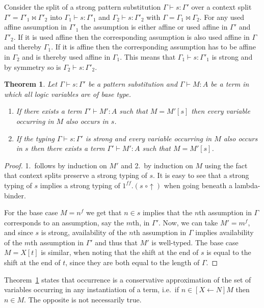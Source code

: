 \documentclass{eptcs}
\newtheorem{thm}{Theorem}[section]
\theoremstyle{definition}
\begin{document}
Consider the split of a strong pattern substitution
$\Gamma\vdash s:\Gamma'$ over a context split
$\Gamma'=\Gamma'_1\Join\Gamma'_2$ into $\Gamma_1\vdash s:\Gamma'_1$ and
$\Gamma_2\vdash s:\Gamma'_2$ with $\Gamma=\Gamma_1\Join\Gamma_2$.
For any used affine assumption in $\Gamma'_1$ the assumption is either
affine or used affine in $\Gamma'$ and $\Gamma'_2$.  If it is used affine then the
corresponding assumption is also used affine in $\Gamma$ and thereby
$\Gamma_1$.  If it is affine then the corresponding assumption has to be
affine in $\Gamma_2$ and is thereby used affine in $\Gamma_1$.  This
means that $\Gamma_1\vdash s:\Gamma'_1$ is strong and by symmetry so is
$\Gamma_2\vdash s:\Gamma'_2$.

\begin{thm}\label{thm:occurrence}
Let $\Gamma\vdash s:\Gamma'$ be a pattern substitution and
$\Gamma\vdash M:A$ be a term in which all logic variables
are of base type.
\begin{enumerate}
\item
If there exists a term $\Gamma'\vdash M':A$ such that $M=M'[s]$
then every variable occurring in $M$ also occurs in $s$.
\item
If the typing $\Gamma\vdash s:\Gamma'$ is strong and every variable
occurring in $M$ also occurs in $s$ then there exists a term
$\Gamma'\vdash M':A$ such that $M=M'[s]$.
\end{enumerate}
\end{thm}
\begin{proof}
1.\ follows by induction on $M'$ and 2.\ by induction on $M$  using the
fact that context splits preserve a strong typing of $s$.  It is easy to see
that a strong typing of $s$ implies a strong typing of
$1^{ff}.(s\;\circ\uparrow)$ when going beneath a lambda-binder.

For the base case
$M=n^f$ we get that $n\in s$ implies that the $n$th assumption in
$\Gamma$ corresponds to an assumption, say the $m$th, in $\Gamma'$.
Now, we can take $M'=m^f$, and since $s$ is strong, availability of the
$n$th assumption in $\Gamma$ implies availability of the $m$th
assumption in $\Gamma'$ and thus that $M'$ is well-typed.
The base case $M=X[t]$ is similar, when noting that the shift at the end
of $s$ is equal to the shift at the end of $t$, since they
are both equal to the length of $\Gamma$.
\end{proof}

Theorem~\ref{thm:occurrence} states that occurrence is a
conservative approximation of the set of
variables occurring in any instantiation of a term,
i.e.\ if $n\in [X\leftarrow N]M$ then $n\in M$.  The opposite is
not necessarily true.
\end{document}
